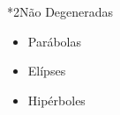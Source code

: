 \documentclass["./AM_2C-Anotacoes.tex"]{subfiles}
\begin{document}
\begin{sectionBox}
\begin{multicols}{2}
\begin{sectionBox}
    \end{sectionBox}

    \begin{sectionBox}*2{Não Degeneradas}
      \begin{itemize}
        \item Parábolas
        \item Elípses
        \item Hipérboles
      \end{itemize}
    \end{sectionBox}

  \end{multicols}

\end{sectionBox}
\end{document}
